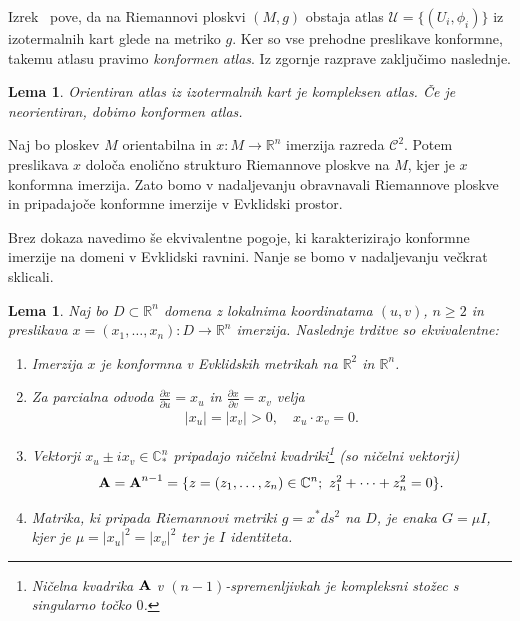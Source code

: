 \documentclass[12pt,a4paper,twoside]{article}
\theoremstyle{definition} %
\theoremstyle{plain} %
\newtheorem{lema}[definicija]{Lema}
\numberwithin{equation}{section}  %
\newcommand{\R}{\mathbb R}
\begin{document}
Izrek~\cite[Theorem~1.8.6]{alarcon2021minimal} pove, da na Riemannovi ploskvi $(M,g)$ obstaja atlas $\mathcal{U} = \{ (U_{i}, \phi_{i}) \}$ iz izotermalnih kart glede na metriko $g$. Ker so vse prehodne preslikave konformne, takemu atlasu pravimo \emph{konformen atlas}. Iz zgornje razprave zaključimo naslednje.

\begin{lema}
Orientiran atlas iz izotermalnih kart je kompleksen atlas. Če je neorientiran, dobimo konformen atlas.
\end{lema}

Naj bo ploskev $M$ orientabilna in $x \colon M \to \R^{n}$ imerzija razreda $\mathcal{C}^2$. Potem preslikava $x$ določa enolično strukturo Riemannove ploskve na $M$, kjer je $x$ konformna imerzija. Zato bomo v nadaljevanju obravnavali Riemannove ploskve in pripadajoče konformne imerzije v Evklidski prostor.

Brez dokaza navedimo še ekvivalentne pogoje, ki karakterizirajo konformne imerzije na domeni v Evklidski ravnini. Nanje se bomo v nadaljevanju večkrat sklicali.

\begin{lema} \label{lema:konform-ekvivalence}
Naj bo $D \subset \mathbb{R}^{n}$ domena z lokalnima koordinatama $(u,v)$, $n \geq 2$ in preslikava $x = (x_{1}, \dots , x_{n}) \colon D \to \mathbb{R}^{n}$ imerzija. Naslednje trditve so ekvivalentne:
\begin{enumerate}
	\item Imerzija $x$ je konformna v Evklidskih metrikah na $\mathbb{R}^2$ in $\mathbb{R}^{n}$.
	\item Za parcialna odvoda $\frac{\partial x}{\partial u} = x_{u}$ in $\frac{\partial x}{\partial v} = x_{v}$ velja
		\begin{gather}
		|x_{u}| = |x_{v}| > 0, \quad x_{u} \cdot x_{v} = 0.
		\end{gather}
	\item Vektorji $x_{u} \pm ix_{v} \in \mathbb{C}_{*}^{n}$ pripadajo \emph{ničelni kvadriki}\footnote{Ničelna kvadrika $\textbf{\textup{A}}$ v $(n-1)$-spremenljivkah je kompleksni stožec s singularno točko $0$.} (so \emph{ničelni vektorji})
		\begin{gather} \label{eq:ničelna-kvadrika}
		\textbf{\textup{A}} = \textbf{\textup{A}}^{n-1} = \{ z=(z_{1}, \dots , z_{n}) \in \mathbb{C}^{n}; \ z_{1}^2 + \cdots + z_{n}^2 = 0 \}.
		\end{gather}
	\item Matrika, ki pripada Riemannovi metriki $g = x^{*}ds^2$ na $D$, je enaka $G = \mu I$, kjer je $\mu = |x_{u}|^2 = |x_{v}|^2$ ter je $I$ identiteta.
\end{enumerate}
\end{lema}
\end{document}
